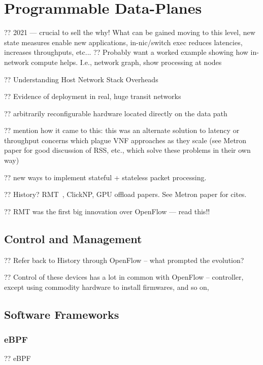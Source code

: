 \chapter{Programmable Data-Planes}

?? 2021 --- crucial to sell the why! What can be gained moving to this level, new state measures enable new applications, in-nic/switch exec reduces latencies, increases throughputs, etc...
?? Probably want a worked example showing how in-network compute helps. I.e., network graph, show processing at nodes

?? Understanding Host Network Stack Overheads~\parencite{DBLP:conf/sigcomm/CaiCVH021}

?? Evidence of deployment in real, huge transit networks~

?? arbitrarily reconfigurable hardware located directly on the data path

?? mention how it came to this: this was an alternate solution to latency or throughput concerns which plague VNF approaches as they scale (see Metron paper for good discussion of RSS, etc., which solve these problems in their own way)

?? new ways to implement stateful + stateless packet processing.

?? History? RMT~\parencite{DBLP:conf/sigcomm/BosshartGKVMIMH13}, ClickNP, GPU offload papers. See Metron paper for cites.


?? RMT was the first big innovation over OpenFlow --- read this!!

\section{Control and Management}

?? Refer back to History through OpenFlow -- what prompted the evolution?

?? Control of these devices has a lot in common with OpenFlow -- controller, except using commodity hardware to install firmwares, and so on,

\section{Software Frameworks}

\subsection{eBPF}
?? eBPF


